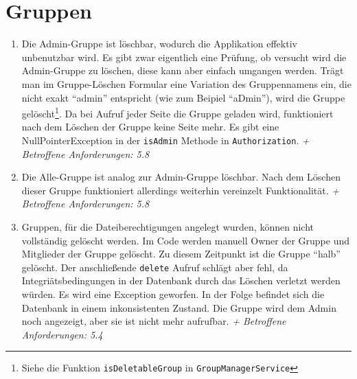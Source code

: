 \documentclass[12pt,DIV14,BCOR10mm,a4paper,parskip=half-,headsepline,headinclude,english,ngerman,bibliography=totocnumbered]{scrreprt}
\begin{document}
\section{Gruppen}
\begin{enumerate}[resume]
\item Die Admin-Gruppe ist löschbar, wodurch die Applikation effektiv unbenutzbar wird. Es gibt zwar eigentlich eine Prüfung, ob versucht wird die Admin-Gruppe zu löschen, diese kann aber einfach umgangen werden. Trägt man im Gruppe-Löschen Formular eine Variation des Gruppennamens ein, die nicht exakt \enquote{admin} entspricht (wie zum Beipiel \enquote{aDmin}), wird die Gruppe gelöscht\footnote{Siehe die Funktion \texttt{isDeletableGroup} in \texttt{GroupManagerService}}. Da bei Aufruf jeder Seite die Gruppe geladen wird, funktioniert nach dem Löschen der Gruppe keine Seite mehr. Es gibt eine NullPointerException in der \texttt{isAdmin} Methode in \texttt{Authorization}.\newline
\textit{+ Betroffene Anforderungen: 5.8}

\item Die Alle-Gruppe ist analog zur Admin-Gruppe löschbar. Nach dem Löschen dieser Gruppe funktioniert allerdings weiterhin vereinzelt Funktionalität.\newline
\textit{+ Betroffene Anforderungen: 5.8}

\item Gruppen, für die Dateiberechtigungen angelegt wurden, können nicht vollständig gelöscht werden. Im Code werden manuell Owner der Gruppe und Mitglieder der Gruppe gelöscht. Zu diesem Zeitpunkt ist die Gruppe \enquote{halb} gelöscht. Der anschließende \texttt{delete} Aufruf schlägt aber fehl, da Integriätsbedingungen in der Datenbank durch das Löschen verletzt werden würden. Es wird eine Exception geworfen. In der Folge befindet sich die Datenbank in einem inkonsistenten Zustand. Die Gruppe wird dem Admin noch angezeigt, aber sie ist nicht mehr aufrufbar.\newline
\textit{+ Betroffene Anforderungen: 5.4}

\end{enumerate}
\end{document}
